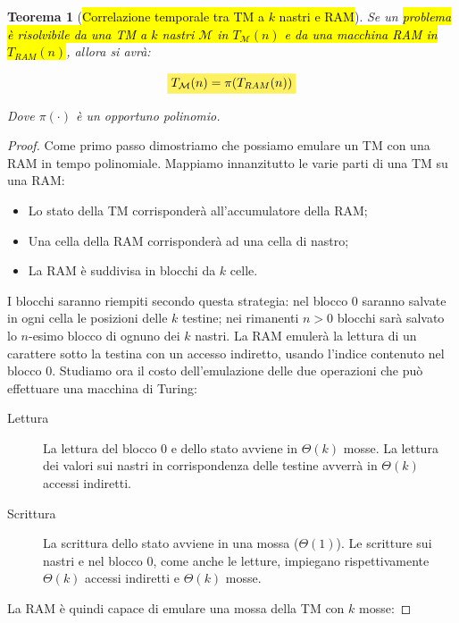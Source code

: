 \documentclass[a4paper,11pt,oneside]{article}
\theoremstyle{plain}
\newtheorem{thm}{Teorema}[section]
\theoremstyle{definition}
\theoremstyle{remark}
\newcommand{\mhl}[1]{\colorbox{hlcolor}{$\displaystyle #1$}}
\begin{document}
\begin{thm}[\hl{Correlazione temporale tra TM a $k$ nastri e RAM}]\label{thm:corr-tm-ram}
  Se un \hl{problema è risolvibile da una TM a $k$ nastri $\mathcal{M}$ in
  $T_\mathcal{M}(n)$ e da una macchina RAM in $T_{RAM}(n)$}, allora si avrà:

  \begin{equation}
    \mhl{ T_\mathcal{M}(n) = \pi(T_{RAM}(n)) }
  \end{equation}

  Dove $\pi(\cdot)$ è un opportuno polinomio.
\end{thm}
\begin{proof}
  Come primo passo dimostriamo che possiamo emulare un TM con una RAM in tempo
  polinomiale. Mappiamo innanzitutto le varie parti di una TM su una RAM\@:

  \begin{itemize}
    \item Lo stato della TM corrisponderà all'accumulatore della RAM;
    \item Una cella della RAM corrisponderà ad una cella di nastro;
    \item La RAM è suddivisa in blocchi da $k$ celle.
  \end{itemize}

  I blocchi saranno riempiti secondo questa strategia: nel blocco $0$ saranno
  salvate in ogni cella le posizioni delle $k$ testine; nei rimanenti $n>0$
  blocchi sarà salvato lo $n$-esimo blocco di ognuno dei $k$ nastri. La RAM
  emulerà la lettura di un carattere sotto la testina con un accesso indiretto,
  usando l'indice contenuto nel blocco $0$. Studiamo ora il costo
  dell'emulazione delle due operazioni che può effettuare una macchina di
  Turing:

  \begin{description}
    \item[Lettura] La lettura del blocco $0$ e dello stato avviene in
      $\Theta(k)$ mosse. La lettura dei valori sui nastri in corrispondenza
      delle testine avverrà in $\Theta(k)$ accessi indiretti.
    \item[Scrittura] La scrittura dello stato avviene in una mossa
      ($\Theta(1)$). Le scritture sui nastri e nel blocco $0$, come anche le
      letture, impiegano rispettivamente $\Theta(k)$ accessi indiretti e
      $\Theta(k)$ mosse.
  \end{description}

  La RAM è quindi capace di emulare una mossa della TM con $k$ mosse:


\end{proof}
\end{document}
